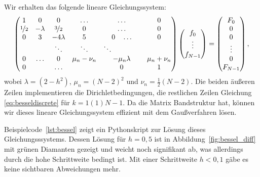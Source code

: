 Wir erhalten das folgende lineare Gleichungssystem:
\begin{equation}
  \begin{pmatrix}
    1 & 0         & 0         &\ldots & \ldots & 0\\
    \nicefrac{1}{2} & -\lambda & \nicefrac{3}{2} & 0 & \ldots & 0\\
    0 & 3         & -4\lambda & 5 & 0\quad \ldots & 0\\
    & & \ddots & \ddots & \ddots\qquad\qquad \\
    0 & \ldots & 0 & \mu_n - \nu_n & -\mu_n\lambda & \mu_n + \nu_n\\
    0 &          &  \ldots  &   & 0      & 1
  \end{pmatrix}
  \begin{pmatrix}
    f_0\\
    \vdots\\
    f_{N-1}
  \end{pmatrix}=
  \begin{pmatrix}
    F_0\\
    0\\
    0\\
    \vdots\\
    0 \\
    F_{N-1}
  \end{pmatrix},
\end{equation}
wobei $\lambda=(2-h^2)$, $\mu_n=(N-2)^2$ und $\nu_n=
\frac{1}{2}(N-2)$. Die beiden äußeren Zeilen implementieren die
Dirichletbedingungen, die restlichen Zeilen Gleichung
\eqref{eq:besseldiscrete} für $k=1(1)N-1$.  Da die Matrix Bandstruktur
hat, können wir dieses lineare Gleichungssystem effizient mit dem
Gaußverfahren lösen.

Beispielcode~\ref{lst:bessel} zeigt ein Pythonskript zur Lösung dieses
Gleichungsssystems. Dessen Lösung für $h=0,5$ ist in
Abbildung~\ref{fig:bessel_diff} mit grünen Diamanten gezeigt und
weicht noch signifikant ab, was allerdings durch die hohe Schrittweite
bedingt ist. Mit einer Schrittweite $h < 0,1$ gäbe es keine sichtbaren
Abweichungen mehr.

